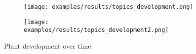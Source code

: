 \begin{figure}
\begin{subfigure}[c]{0.5\textwidth}
\texttt{[image: examples/results/topics\_development.png]}
 \label{fig:topics_development}
\end{subfigure}
\begin{subfigure}[c]{0.5\textwidth}
\texttt{[image: examples/results/topics\_development2.png]}
 \label{fig:topics_development2}
\end{subfigure}
\caption{Plant development over time} 
\end{figure}


